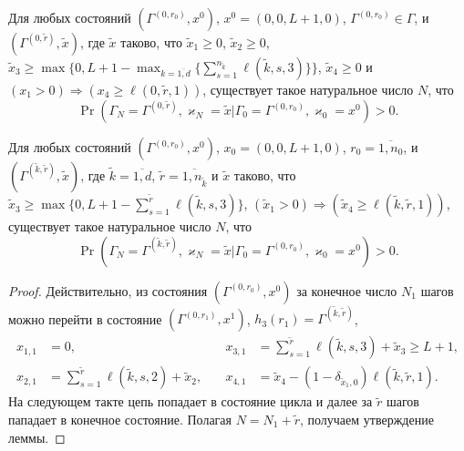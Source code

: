 \documentclass[a4paper,12pt,russian]{extarticle}
\begin{document}
\begin{lemma}
Для любых состояний $(\Gamma^{(0,r_0)},x^0)$, $x^0=(0,0,L+1,0)$, $\Gamma^{(0,r_0)} \in \Gamma$, и
$(\Gamma^{(0,\tilde{r})},\tilde{x})$,
где $\tilde{x}$ таково, что $\tilde{x}_1 \geqslant 0$, $\tilde{x}_2\geqslant 0$, $\tilde{x}_3\geqslant \max{\{0,L+1-\max_{k=\overline{1,d}}{\{\sum_{s=1}^{n_{\tilde{k}}} \ell(\tilde{k},s,3)\}}\}}$, $\tilde{x}_4\geqslant 0$ и $(x_1 > 0)\Rightarrow (x_4\geqslant \ell(0,\tilde{r},1))$, существует такое натуральное число $N$, что 
\begin{equation*}
\Pr(\Gamma_{N}=\Gamma^{(0,\tilde{r} )}, \varkappa_{N}=\tilde{x}|
\Gamma_{0}=\Gamma^{(0,r_0)}, \varkappa_{0}=x^0)>0.
\end{equation*}
\end{lemma}

\begin{lemma}
Для любых состояний $(\Gamma^{(0,r_0)},x^0)$, $x_0=(0,0,L+1,0)$, $r_0=\overline{1,n_0}$, и
$(\Gamma^{(\tilde{k},\tilde{r})},\tilde{x})$,
где $\tilde{k}=\overline{1,d}$, $\tilde{r} = \overline{1,n_{\tilde{k}}}$ и $\tilde{x}$ таково, что $\tilde{x}_3\geqslant \max{\{0,L+1-\sum_{s=1}^{\tilde{r}}\ell(\tilde{k},s,3)\}}$,
$(\tilde{x}_1>0) \Rightarrow (\tilde{x}_4\geqslant \ell(\tilde{k},\tilde{r},1))$, существует такое натуральное число $N$, что 
\begin{equation*}
\Pr(\Gamma_{N}=\Gamma^{(\tilde{k},\tilde{r} )}, \varkappa_{N}=\tilde{x}|
\Gamma_{0}=\Gamma^{(0,r_0)}, \varkappa_{0}=x^0)>0.
\end{equation*}
\end{lemma}
\begin{proof}
Действительно, из состояния $(\Gamma^{(0,r_0)},x^0)$ за конечное число $N_1$ шагов можно перейти в состояние $(\Gamma^{(0,r_1)},x^1)$, $h_3(r_1)=\Gamma^{(\tilde{k},\tilde{r})}$,
\begin{align*}
x_{1,1}&=0,& \quad x_{3,1}&=\sum_{s=1}^{\tilde{r}} \ell(\tilde{k},s,3) +\tilde{x}_3\geqslant L+1, \\
x_{2,1}&=\sum_{s=1}^{\tilde{r}} \ell(\tilde{k},s,2) + \tilde{x}_2,& \quad x_{4,1}&=\tilde{x}_4 -  (1- \delta_{\tilde{x}_1,0}) \ell(\tilde{k},\tilde{r},1).
\end{align*}
На следующем такте цепь попадает в состояние цикла и далее за $\tilde{r}$ шагов пападает в конечное состояние. Полагая $N=N_1+\tilde{r}$, получаем утверждение леммы.
\end{proof}
\end{document}

